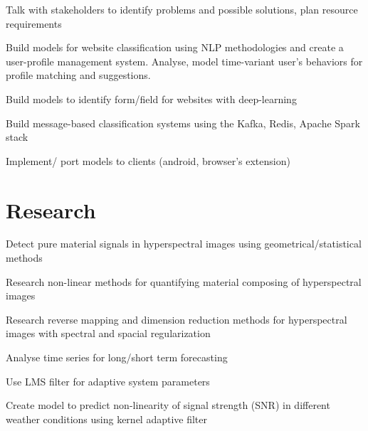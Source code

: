 \documentclass[letterpaper]{deedy-resume} %
\begin{document}
\begin{minipage}[t]{0.66\textwidth}
\begin{tightitemize}
\item Talk with stakeholders to identify problems and possible solutions, plan resource requirements
\item Build models for website classification using NLP methodologies and create a user-profile management system. Analyse, model time-variant user's behaviors for profile matching and suggestions.
\item Build models to identify form/field for websites with deep-learning
\item Build message-based classification systems using the Kafka, Redis, Apache Spark stack
\item Implement/ port models to clients (android, browser's extension)
\end{tightitemize}
\sectionspace %


\section {
    Research
}
\begin{tightitemize}
\item Detect pure material signals in hyperspectral images using geometrical/statistical methods
\item Research non-linear methods for quantifying material composing of hyperspectral images
\item Research reverse mapping and dimension reduction methods for hyperspectral images with spectral and spacial regularization
\end{tightitemize}
\sectionspace %

\begin{tightitemize}
\item Analyse time series for long/short term forecasting
\item Use LMS filter for adaptive system parameters
\item Create model to predict non-linearity of signal strength (SNR) in different weather conditions using kernel adaptive filter
\end{tightitemize}
\sectionspace %



\end{minipage} %
\end{document}
